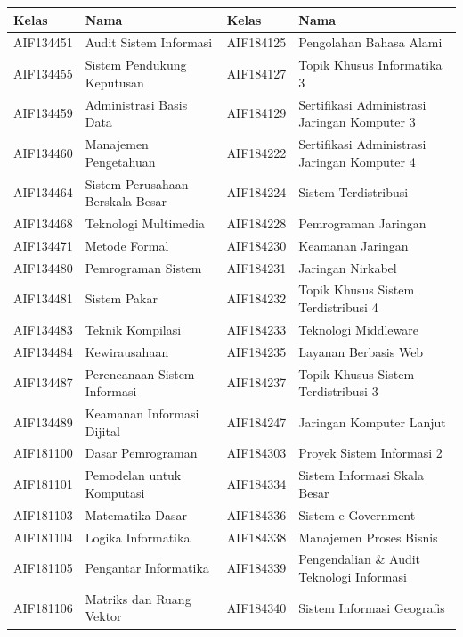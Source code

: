 \begin{enumerate}
\begin{table}[H]
\centering
\label{tab:kelasmatakuliah2018_3}
\begin{tabular}{|p{3.25cm}|p{4.25cm}|p{3.25cm}|p{4.25cm}|}
\hline
\textbf{Kelas} & \textbf{Nama} & \textbf{Kelas} & \textbf{Nama} \\ \hline
AIF134451 & Audit Sistem Informasi & AIF184125 & Pengolahan Bahasa Alami \\ \hline
AIF134455 & Sistem Pendukung Keputusan & AIF184127 & Topik Khusus Informatika 3 \\ \hline
AIF134459 & Administrasi Basis Data & AIF184129 & Sertifikasi Administrasi Jaringan Komputer 3 \\ \hline
AIF134460 & Manajemen Pengetahuan & AIF184222 & Sertifikasi Administrasi Jaringan Komputer 4 \\ \hline
AIF134464 & Sistem Perusahaan Berskala Besar & AIF184224 & Sistem Terdistribusi \\ \hline
AIF134468 & Teknologi Multimedia & AIF184228 & Pemrograman Jaringan \\ \hline
AIF134471 & Metode Formal & AIF184230 & Keamanan Jaringan \\ \hline
AIF134480 & Pemrograman Sistem & AIF184231 & Jaringan Nirkabel \\ \hline
AIF134481 & Sistem Pakar & AIF184232 & Topik Khusus Sistem Terdistribusi 4 \\ \hline
AIF134483 & Teknik Kompilasi & AIF184233 & Teknologi Middleware \\ \hline
AIF134484 & Kewirausahaan & AIF184235 & Layanan Berbasis Web \\ \hline
AIF134487 & Perencanaan Sistem Informasi & AIF184237 & Topik Khusus Sistem Terdistribusi 3 \\ \hline
AIF134489 & Keamanan Informasi Dijital & AIF184247 & Jaringan Komputer Lanjut \\ \hline
AIF181100 & Dasar Pemrograman & AIF184303 & Proyek Sistem Informasi 2 \\ \hline
AIF181101 & Pemodelan untuk Komputasi & AIF184334 & Sistem Informasi Skala Besar \\ \hline
AIF181103 & Matematika Dasar & AIF184336 & Sistem e-Government \\ \hline
AIF181104 & Logika Informatika & AIF184338 & Manajemen Proses Bisnis \\ \hline
AIF181105 & Pengantar Informatika & AIF184339 & Pengendalian \& Audit Teknologi Informasi \\ \hline
AIF181106 & Matriks dan Ruang Vektor & AIF184340 & Sistem Informasi Geografis \\ \hline

\end{tabular}
\end{table}
\end{enumerate}
